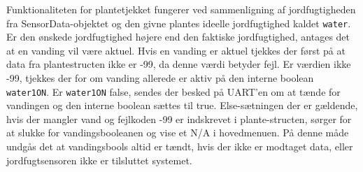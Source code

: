 Funktionaliteten for plantetjekket fungerer ved sammenligning af jordfugtigheden fra SensorData-objektet og den givne plantes ideelle jordfugtighed kaldet \texttt{water}. Er den ønskede jordfugtighed højere end den faktiske jordfugtighed, antages det at en vanding vil være aktuel. Hvis en vanding er aktuel tjekkes der først på at data fra plantestructen ikke er -99, da denne værdi betyder fejl. Er værdien ikke -99, tjekkes der for om vanding allerede er aktiv på den interne boolean \texttt{water1ON}. Er \texttt{water1ON} false, sendes der besked på UART'en om at tænde for vandingen og den interne boolean sættes til true.
Else-sætningen der er gældende, hvis der mangler vand og fejlkoden -99 er indskrevet i plante-structen, sørger for at slukke for vandingsbooleanen og vise et N/A i hovedmenuen. På denne måde undgås det at vandingsbools altid er tændt, hvis der ikke er modtaget data, eller jordfugtsensoren ikke er tilsluttet systemet.
